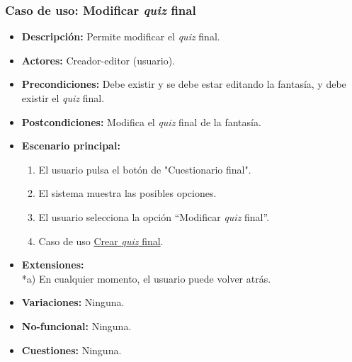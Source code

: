 \subsubsection{Caso de uso: Modificar \textit{quiz} final}
\begin{itemize}
	\item \textbf{Descripción:} Permite modificar el \textit{quiz} final.
	\item \textbf{Actores:} Creador-editor (usuario).
	\item \textbf{Precondiciones:} Debe existir y se debe estar editando la fantasía, y debe existir el \textit{quiz} final.
	\item \textbf{Postcondiciones:} Modifica el \textit{quiz} final de la fantasía.
	\item \textbf{Escenario principal:}
	\begin{enumerate}
		\item El usuario pulsa el botón de "Cuestionario final".
		\item El sistema muestra las posibles opciones.
		\item El usuario selecciona la opción ``Modificar \textit{quiz} final''.
		\item Caso de uso \hyperlink{crearquizfinal}{Crear \textit{quiz} final}.
	\end{enumerate}
	\item \textbf{Extensiones:} \\ *a) En cualquier momento, el usuario puede volver atrás.
	\item \textbf{Variaciones:} Ninguna.
	\item \textbf{No-funcional:} Ninguna.
	\item \textbf{Cuestiones:} Ninguna.
\end{itemize}

